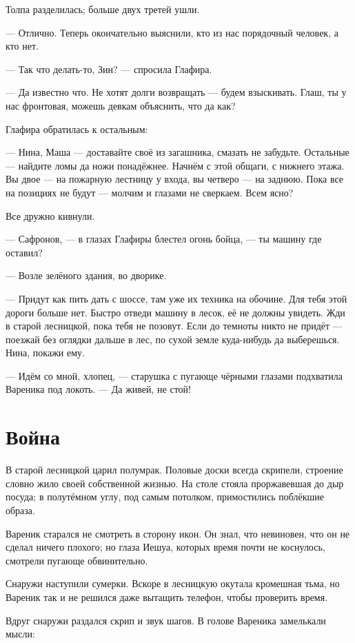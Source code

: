 \documentclass[a4paper,10pt,fleqn]{book}\usepackage{polyglossia}\setdefaultlanguage{english}\setotherlanguage{russian}\defaultfontfeatures{Ligatures=TeX,Mapping=tex-text} \usepackage{xcolor}\definecolor{lightgray}{HTML}{bbbbbb}\color{lightgray}\newcommand{\ml}[3]{\textcolor{black}{#3}}
\begin{document}
Толпа разделилась;
больше двух третей ушли.

--- Отлично.
Теперь окончательно выяснили, кто из нас порядочный человек, а кто нет.

--- Так что делать-то, Зин? --- спросила Глафира.

--- Да известно что.
Не хотят долги возвращать --- будем взыскивать.
Глаш, ты у нас фронтовая, можешь девкам объяснить, что да как?

Глафира обратилась к остальным:

--- Нина, Маша --- доставайте своё из загашника, смазать не забудьте.
Остальные --- найдите ломы да ножи понадёжнее.
Начнём с этой общаги, с нижнего этажа.
Вы двое --- на пожарную лестницу у входа, вы четверо --- на заднюю.
Пока все на позициях не будут --- молчим и глазами не сверкаем.
Всем ясно?

Все дружно кивнули.

--- Сафронов, --- в глазах Глафиры блестел огонь бойца, --- ты машину где оставил?

--- Возле зелёного здания, во дворике.

--- Придут как пить дать с шоссе, там уже их техника на обочине.
Для тебя этой дороги больше нет.
Быстро отведи машину в лесок, её не должны увидеть.
Жди в старой лесницкой, пока тебя не позовут.
Если до темноты никто не придёт --- поезжай без оглядки дальше в лес, по сухой земле куда-нибудь да выберешься.
Нина, покажи ему.

--- Идём со мной, хлопец, --- старушка с пугающе чёрными глазами подхватила Вареника под локоть.
--- Да живей, не стой!

\section{Война}

В старой лесницкой царил полумрак.
Половые доски всегда скрипели, строение словно жило своей собственной жизнью.
На столе стояла проржавевшая до дыр посуда;
в полутёмном углу, под самым потолком, примостились поблёкшие образа.

Вареник старался не смотреть в сторону икон.
Он знал, что невиновен, что он не сделал ничего плохого;
но глаза Иешуа, которых время почти не коснулось, смотрели пугающе обвинительно.

Снаружи наступили сумерки.
Вскоре в лесницкую окутала кромешная тьма, но Вареник так и не решился даже вытащить телефон, чтобы проверить время.

Вдруг снаружи раздался скрип и звук шагов.
В голове Вареника замелькали мысли:
\end{document}

